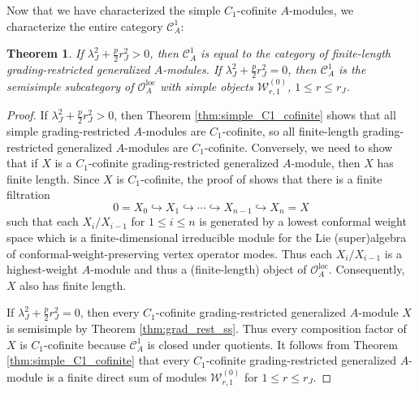 \documentclass[11pt, reqno]{amsart}
\newtheorem{thm}{Theorem}[section]
\theoremstyle{definition}\newtheorem{defi}[thm]{Definition}
\theoremstyle{definition}\newtheorem{rem}[thm]{Remark}
\theoremstyle{definition}\newtheorem{exam}[thm]{Example}
\theoremstyle{definition}\newtheorem{assum}[thm]{Assumption}
\newcommand{\cO}{\mathcal{O}}
\newcommand{\cC}{\mathcal{C}}
\newcommand{\cW}{\mathcal{W}}
\newcommand{\Oloc}{\cO^{\mathrm{loc}}}
\begin{document}
Now that we have characterized the simple $C_1$-cofinite $A$-modules, we characterize the entire category $\cC_A^1$:
\begin{thm}\label{thm:C_1-cofin}
If $\lambda_J^2+\frac{p}{2}r_J^2>0$, then $\cC_A^1$ is equal to the category of finite-length grading-restricted generalized $A$-modules. If $\lambda_J^2+\frac{p}{2}r_J^2=0$, then $\cC_A^1$ is the semisimple subcategory of $\Oloc_A$ with simple objects $\cW_{r,1}^{(0)}$, $1\leq r\leq r_J$.
\end{thm}
\begin{proof}
If $\lambda_J^2+\frac{p}{2}r_J^2>0$, then Theorem \ref{thm:simple_C1_cofinite} shows that all simple grading-restricted $A$-modules are $C_1$-cofinite, so all finite-length grading-restricted generalized $A$-modules are $C_1$-cofinite. Conversely, we need to show that if $X$ is a $C_1$-cofinite grading-restricted generalized $A$-module, then $X$ has finite length. Since $X$ is $C_1$-cofinite, the proof of \cite[Theorem 3.3.5]{CY} shows that there is a finite filtration
\begin{equation*}
0=X_0\hookrightarrow X_1\hookrightarrow\cdots\hookrightarrow X_{n-1}\hookrightarrow X_n =X
\end{equation*}
such that each $X_i/X_{i-1}$ for $1\leq i\leq n$ is generated by a lowest conformal weight space which is a finite-dimensional irreducible module for the Lie (super)algebra of conformal-weight-preserving vertex operator modes. Thus each $X_i/X_{i-1}$ is a highest-weight $A$-module and thus a (finite-length) object of $\Oloc_A$. Consequently, $X$ also has finite length.

If $\lambda_J^2+\frac{p}{2}r_J^2=0$, then every $C_1$-cofinite grading-restricted generalized $A$-module $X$ is semisimple by Theorem \ref{thm:grad_rest_ss}. Thus every composition factor of $X$ is $C_1$-cofinite because $\cC_A^1$ is closed under quotients. It follows from Theorem \ref{thm:simple_C1_cofinite}  that every $C_1$-cofinite grading-restricted generalized $A$-module is a finite direct sum of modules $\cW_{r,1}^{(0)}$ for $1\leq r\leq r_J$.
\end{proof}
\end{document}
